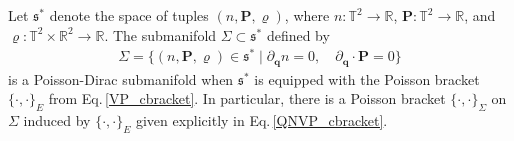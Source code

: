 \documentclass[10pt,a4paper]{amsart}
\begin{document}
\begin{proposition}\label{PD_proposition}
Let $\mathfrak{s}^*$ denote the space of tuples $(n,\bm{P},\varrho)$, where $n:\mathbb{T}^2\rightarrow\mathbb{R}$, $\bm{P}:\mathbb{T}^2\rightarrow\mathbb{R}$, and $\varrho:\mathbb{T}^2\times\mathbb{R}^2\rightarrow\mathbb{R}$. The submanifold $\Sigma\subset\mathfrak{s}^*$ defined by 
\begin{align*}
\Sigma = \{(n,\bm{P},\varrho)\in\mathfrak{s}^*\mid \partial_{\bm{q}}n = 0,\quad \partial_{\bm{q}}\cdot\bm{P} = 0\}
\end{align*}
is a Poisson-Dirac submanifold when $\mathfrak{s}^*$ is equipped with the Poisson bracket $\{\cdot,\cdot\}_E$ from Eq.\,\eqref{VP_cbracket}. In particular, there is a Poisson bracket $\{\cdot,\cdot\}_\Sigma$ on $\Sigma$ induced by $\{\cdot,\cdot\}_E$ given explicitly in Eq.\,\eqref{QNVP_cbracket}.
\end{proposition}
\end{document}
